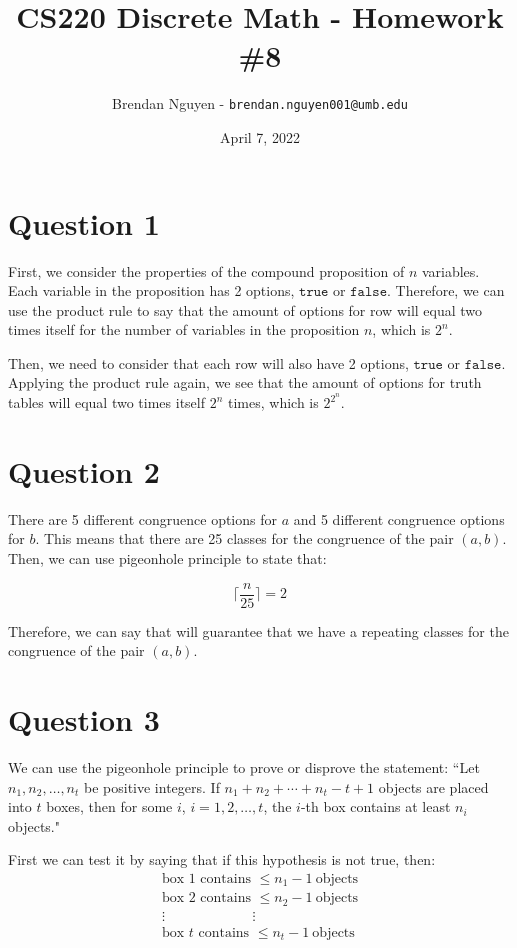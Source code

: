 \documentclass[letterpaper, 12pt]{article}
\title{CS220 Discrete Math - Homework \#8}
\author{Brendan Nguyen - \texttt{brendan.nguyen001@umb.edu}}
\date{April 7, 2022}
\begin{document}
\maketitle

\section*{Question 1}
First, we consider the properties of the compound proposition of $n$ variables. Each variable in the proposition has 2 options, $\texttt{true}$ or $\texttt{false}$. Therefore, we can use the product rule to say that the amount of options for row will equal two times itself for the number of variables in the proposition $n$, which is $2^n$.

Then, we need to consider that each row will also have 2 options, $\texttt{true}$ or $\texttt{false}$. Applying the product rule again, we see that the amount of options for truth tables will equal two times itself $2^n$ times, which is $2^{2^n}$.

\section*{Question 2}
There are 5 different congruence options for $a$ and 5 different congruence options for $b$. This means that there are 25 classes for the congruence of the pair $(a, b)$. Then, we can use pigeonhole principle to state that:

\[\Big\lceil\frac{n}{25}\Big\rceil = 2\]

Therefore, we can say that  will guarantee that we have a repeating classes for the congruence of the pair $(a, b)$.

\section*{Question 3}
We can use the pigeonhole principle to prove or disprove the statement: ``Let $n_1,n_2,\ldots,n_t$ be positive integers. If $n_1 + n_2 + \cdots + n_t - t + 1$ objects are placed into $t$ boxes, then for some $i$, $i = 1,2,\ldots,t$, the $i$-th box contains at least $n_i$ objects."

First we can test it by saying that if this hypothesis is not true, then:
\begin{gather*}
    \text{box 1 contains } \leq n_1 - 1\ \text{objects}\\
    \text{box 2 contains } \leq n_2 - 1\ \text{objects}\\
    \vdots\hspace{75pt}\vdots\\
    \text{box $t$ contains } \leq n_t - 1\ \text{objects}
\end{gather*}
\end{document}
